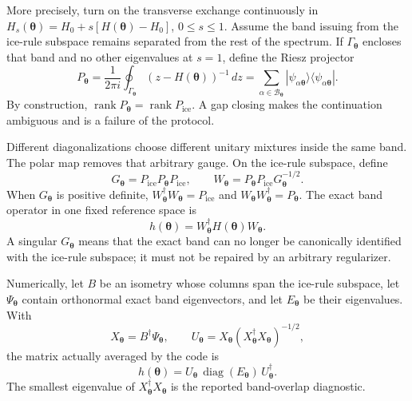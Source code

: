 \documentclass[11pt]{article}
\newcommand{\btheta}{\bm\theta}
\newcommand{\Pice}{P_{\mathrm{ice}}}
\begin{document}
More precisely, turn on the transverse exchange continuously in
$H_s(\btheta)=H_0+s[H(\btheta)-H_0]$, $0\le s\le1$.  Assume the band issuing
from the ice-rule subspace remains separated from the rest of the
spectrum.  If $\Gamma_{\btheta}$ encloses that band and no other eigenvalues
at $s=1$, define the Riesz projector
\begin{equation}
 P_{\btheta}=\frac{1}{2\pi i}\oint_{\Gamma_{\btheta}}
 (z-H(\btheta))^{-1}\,dz
 =\sum_{\alpha\in\mathcal B_{\btheta}}
 |\psi_{\alpha\btheta}\rangle\langle\psi_{\alpha\btheta}|.
 \label{eq:Ptheta}
\end{equation}
By construction,
$\operatorname{rank}P_{\btheta}=\operatorname{rank}\Pice$.  A gap closing
makes the continuation ambiguous and is a failure of the protocol.

Different diagonalizations choose different unitary mixtures inside the same
band.  The polar map removes that arbitrary gauge.  On the ice-rule subspace,
define
\begin{equation}
 G_{\btheta}=\Pice P_{\btheta}\Pice,
 \qquad
 W_{\btheta}=P_{\btheta}\Pice G_{\btheta}^{-1/2}.
 \label{eq:polar}
\end{equation}
When $G_{\btheta}$ is positive definite,
$W_{\btheta}^\dagger W_{\btheta}=\Pice$ and
$W_{\btheta}W_{\btheta}^\dagger=P_{\btheta}$.  The exact band operator in one
fixed reference space is
\begin{equation}
 h(\btheta)=W_{\btheta}^\dagger H(\btheta)W_{\btheta}.
 \label{eq:pullback}
\end{equation}
A singular $G_{\btheta}$ means that the exact band can no longer be
canonically identified with the ice-rule subspace; it must not be repaired by
an arbitrary regularizer.

Numerically, let $B$ be an isometry whose columns span the ice-rule subspace,
let $\Psi_{\btheta}$ contain orthonormal exact band
eigenvectors, and let $E_{\btheta}$ be their eigenvalues.  With
\begin{equation}
 X_{\btheta}=B^\dagger\Psi_{\btheta},\qquad
 U_{\btheta}=X_{\btheta}(X_{\btheta}^\dagger X_{\btheta})^{-1/2},
\end{equation}
the matrix actually averaged by the code is
\begin{equation}
 h(\btheta)=U_{\btheta}\,\operatorname{diag}(E_{\btheta})\,
 U_{\btheta}^\dagger.
 \label{eq:numericalpullback}
\end{equation}
The smallest eigenvalue of $X_{\btheta}^\dagger X_{\btheta}$ is the reported
band-overlap diagnostic.
\end{document}
